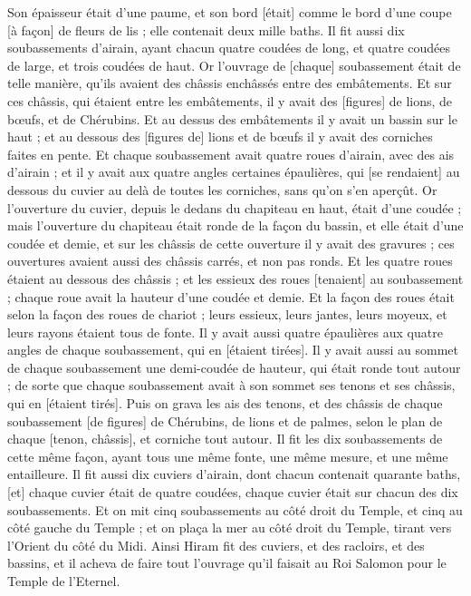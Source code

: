 \begin{multicols}{2}
Son épaisseur était d'une paume, et son bord [était] comme le bord d'une coupe [à façon] de fleurs de lis ; elle contenait deux mille baths.
Il fit aussi dix soubassements d'airain, ayant chacun quatre coudées de long, et quatre coudées de large, et trois coudées de haut.
Or l'ouvrage de [chaque] soubassement était de telle manière, qu'ils avaient des châssis enchâssés entre des embâtements.
Et sur ces châssis, qui étaient entre les embâtements, il y avait des [figures] de lions, de bœufs, et de Chérubins. Et au dessus des embâtements il y avait un bassin sur le haut ; et au dessous des [figures de] lions et de bœufs il y avait des corniches faites en pente.
Et chaque soubassement avait quatre roues d'airain, avec des ais d'airain ; et il y avait aux quatre angles certaines épaulières, qui [se rendaient] au dessous du cuvier au delà de toutes les corniches, sans qu'on s'en aperçût.
Or l'ouverture du cuvier, depuis le dedans du chapiteau en haut, était d'une coudée ; mais l'ouverture du chapiteau était ronde de la façon du bassin, et elle était d'une coudée et demie, et sur les châssis de cette ouverture il y avait des gravures ; ces ouvertures avaient aussi des châssis carrés, et non pas ronds.
Et les quatre roues étaient au dessous des châssis ; et les essieux des roues [tenaient] au soubassement ; chaque roue avait la hauteur d'une coudée et demie.
Et la façon des roues était selon la façon des roues de chariot ; leurs essieux, leurs jantes, leurs moyeux, et leurs rayons étaient tous de fonte.
Il y avait aussi quatre épaulières aux quatre angles de chaque soubassement, qui en [étaient tirées].
Il y avait aussi au sommet de chaque soubassement une demi-coudée de hauteur, qui était ronde tout autour ; de sorte que chaque soubassement avait à son sommet ses tenons et ses châssis, qui en [étaient tirés].
Puis on grava les ais des tenons, et des châssis de chaque soubassement [de figures] de Chérubins, de lions et de palmes, selon le plan de chaque [tenon, châssis], et corniche tout autour.
Il fit les dix soubassements de cette même façon, ayant tous une même fonte, une même mesure, et une même entailleure.
Il fit aussi dix cuviers d'airain, dont chacun contenait quarante baths, [et] chaque cuvier était de quatre coudées, chaque cuvier était sur chacun des dix soubassements.
Et on mit cinq soubassements au côté droit du Temple, et cinq au côté gauche du Temple ; et on plaça la mer au côté droit du Temple, tirant vers l'Orient du côté du Midi.
Ainsi Hiram fit des cuviers, et des racloirs, et des bassins, et il acheva de faire tout l'ouvrage qu'il faisait au Roi Salomon pour le Temple de l'Eternel.

\end{multicols}
